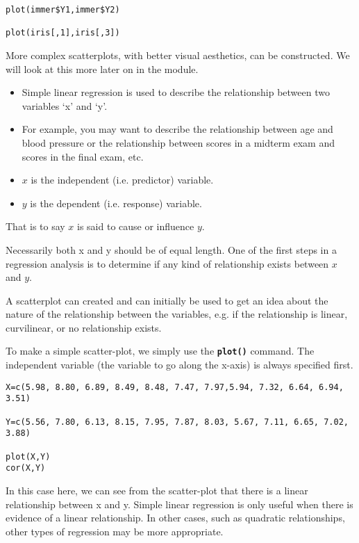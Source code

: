 \begin{framed}
\begin{verbatim}
plot(immer$Y1,immer$Y2)

plot(iris[,1],iris[,3])
\end{verbatim}
\end{framed}
More complex scatterplots, with better visual aesthetics, can be constructed. We will look at this more later on in the module.
\begin{itemize}

\item Simple linear regression is used to describe the relationship between two variables ‘x’ and ‘y’.

\item 
For example, you may want to describe the relationship between age and blood pressure or the relationship between scores in a midterm exam and scores in the final exam, etc.
\end{itemize}

\begin{itemize}
\item	$x$ is the independent (i.e. predictor) variable.
\item	$y$ is the dependent (i.e. response) variable.
\end{itemize}
That is to say $x$ is said to cause or influence $y$.

Necessarily both x and y should be of equal length. One of the first steps in a regression analysis is to determine if any kind of relationship exists between $x$ and $y$.

A scatterplot can created and can initially be used to get an idea about the nature of the relationship between the variables, e.g. if the relationship is linear, curvilinear, or no relationship exists.

To make a simple scatter-plot, we simply use the \texttt{\textbf{plot()}} command. The independent variable (the variable to go along the x-axis) is always specified first.



\begin{framed}
\begin{verbatim}
X=c(5.98, 8.80, 6.89, 8.49, 8.48, 7.47, 7.97,5.94, 7.32, 6.64, 6.94, 3.51)

Y=c(5.56, 7.80, 6.13, 8.15, 7.95, 7.87, 8.03, 5.67, 7.11, 6.65, 7.02, 3.88)

plot(X,Y)
cor(X,Y)
\end{verbatim}
\end{framed}
In this case here, we can see from the scatter-plot that there is a linear relationship between x and y.
Simple linear regression is only useful when there is evidence of a linear relationship. In other cases, such as quadratic relationships, other types of regression may be more appropriate.

